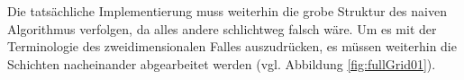 \documentclass[a4paper,12pt]{llncs}
\numberwithin{equation}{section}
\begin{document}
Die tatsächliche Implementierung muss weiterhin die grobe Struktur des naiven Algorithmus verfolgen, da alles andere schlichtweg falsch wäre. Um es mit der Terminologie des zweidimensionalen Falles auszudrücken, es müssen weiterhin die Schichten nacheinander abgearbeitet werden (vgl. Abbildung \ref{fig:fullGrid01}).

\begin{figure}

\end{figure}
\end{document}
